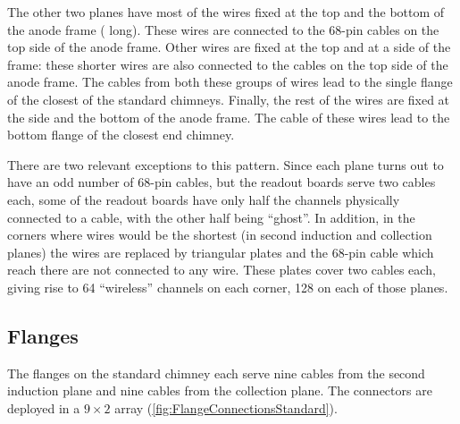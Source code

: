 The other two planes have most of the wires fixed at the top and the bottom of the anode frame
( long).
These wires are connected to the 68-pin cables on the top side of the anode frame.
Other wires are fixed at the top and at a side of the frame:
these shorter wires are also connected to the cables on the top side of the anode frame.
The cables from both these groups of wires lead to the single flange of the closest of the standard chimneys.
Finally, the rest of the wires are fixed at the side and the bottom of the anode frame.
The cable of these wires lead to the bottom flange of the closest end chimney.

There are two relevant exceptions to this pattern.
Since each plane turns out to have an odd number of 68-pin cables,
but the readout boards serve two cables each,
some of the readout boards have only half the channels physically connected to a cable,
with the other half being ``ghost''.
In addition, in the corners where wires would be the shortest
(in second induction and collection planes) the wires are replaced by triangular
plates and the 68-pin cable which reach there are not connected to any wire.
These plates cover two cables each, giving rise to 64 ``wireless'' channels on
each corner, 128 on each of those planes.


\subsection{Flanges}

The flanges on the standard chimney each serve nine cables from the second induction plane
and nine cables from the collection plane.
The connectors are deployed in a $9 \times 2$ array (\cref{fig:FlangeConnectionsStandard}).

